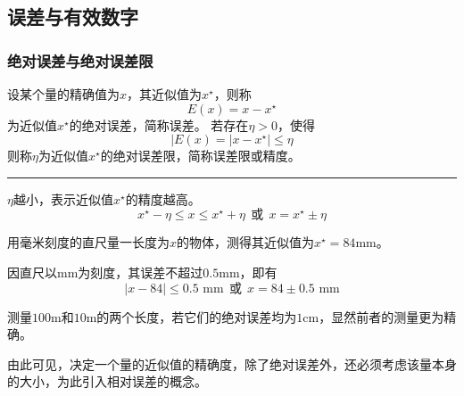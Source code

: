 \subsection{误差与有效数字}

\subsubsection{绝对误差与绝对误差限}
\begin{frame}\ft{\subsecname}

\begin{dingyi}[绝对误差与绝对误差限]
设某个量的精确值为$x$，其近似值为$x^{\star}$，则称
$$
E(x) = x - x^{\star}
$$
为近似值$x^{\star}$的\textcolor{acolor5}{绝对误差}，简称\textcolor{acolor5}{误差}。
若存在$\eta>0$，使得
$$
|E(x)=|x - x^{\star}|\le\eta
$$
则称$\eta$为近似值$x^{\star}$的\textcolor{acolor5}{绝对误差限}，简称\textcolor{acolor5}{误差限}或\textcolor{acolor5}{精度}。
\end{dingyi}

\rule{\textwidth}{.5mm}
$\eta$越小，表示近似值$x^{\star}$的精度越高。
$$
x^{\star} - \eta \le x \le x^{\star} +  \eta
~~\mbox{或}~~
x = x^{\star} \pm \eta
$$

\end{frame}


\begin{frame}\ft{\subsecname} 



\begin{li}
用毫米刻度的直尺量一长度为$x$的物体，测得其近似值为$x^{\star}=84$mm。
\end{li}
\vspace{0.3cm}
\pause

因直尺以mm为刻度，其误差不超过$0.5$mm，即有
$$
|x-84|\le0.5 \mbox{~mm}
~~\mbox{或}~~
x=84\pm0.5\mbox{~mm}
$$

\end{frame}

\begin{frame}\ft{\subsecname}\fst{\subsubsecname}

\begin{li}
测量$100$m和$10$m的两个长度，若它们的绝对误差均为$1$cm，显然前者的测量更为精确。
\end{li}

\pause
\vspace{0.3cm}
由此可见，决定一个量的近似值的精确度，\textcolor{acolor3}{除了绝对误差外，还必须考虑该量本身的大小}，为此引入相对误差的概念。

\end{frame}

